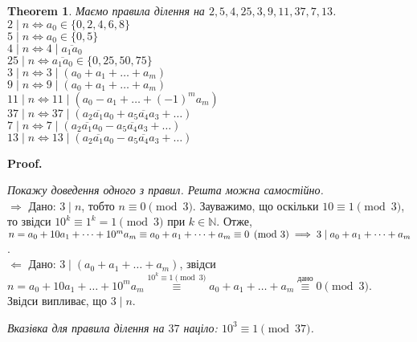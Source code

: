 \documentclass[a4paper, 14pt]{extarticle}
\makeatletter
\theoremstyle{theoremdd}
\newtheorem{theorem}{Theorem}[subsection]
\theoremstyle{theoremdd}
\theoremstyle{theoremdd}
\theoremstyle{theoremdd}
\theoremstyle{theoremdd}
\theoremstyle{theoremdd}
\theoremstyle{theoremdd}
\theoremstyle{theoremdd}
\def\qed{$\blacksquare$}
\def\rightproof{$\boxed{\Rightarrow}$ }
\def\leftproof{$\boxed{\Leftarrow}$ }
\renewenvironment{proof}[1][Proof.\\]{\par
\pushQED{\hfill \qed}%
\normalfont \topsep6\p@\@plus6\p@\relax
\trivlist
\item\relax
{\bfseries
#1\@addpunct{.}}\hspace\labelsep\ignorespaces
}{%
\popQED\endtrivlist\@endpefalse
}
\makeatother
\begin{document}
\begin{theorem}
Маємо правила ділення на $2,5,4,25,3,9,11,37,7,13$.\\
$2 \mid n \iff a_0 \in \{0,2,4,6,8\}$\\
$5 \mid n \iff a_0 \in \{0,5\}$\\
$4 \mid n \iff 4 \mid \overline{a_1a_0}$\\
$25 \mid n \iff \overline{a_1a_0} \in \{0,25,50,75\}$\\
$3 \mid n \iff 3 \mid (a_0 + a_1 + \dots + a_m)$\\
$9 \mid n \iff 9 \mid (a_0 + a_1 + \dots + a_m)$\\
$11 \mid n \iff 11 \mid (a_0 - a_1 + \dots + (-1)^m a_m)$\\
$37 \mid n \iff 37 \mid (\overline{a_2a_1a_0} + \overline{a_5a_4a_3} + \dots)$\\
$7 \mid n \iff 7 \mid (\overline{a_2a_1a_0} - \overline{a_5a_4a_3} + \dots)$\\
$13 \mid n \iff 13 \mid (\overline{a_2a_1a_0} - \overline{a_5a_4a_3} + \dots)$
\end{theorem}

\begin{proof}
\textit{Покажу доведення одного з правил. Решта можна самостійно.}\\
\rightproof Дано: $3 \mid n$, тобто $n \equiv 0 \pmod 3$. Зауважимо, що оскільки $10 \equiv 1 \pmod 3$, то звідси $10^k \equiv 1^k = 1 \pmod 3$ при $k \in \mathbb{N}$. Отже,\\
$n = a_0 + 10a_1 + \dots + 10^m a_m \equiv a_0 + a_1 + \dots + a_m \equiv 0 \pmod 3 \\ \implies 3 \mid a_0 + a_1 + \dots + a_m$.
\bigskip \\
\leftproof Дано: $3 \mid (a_0 + a_1 + \dots + a_m)$, звідси\\
$n = a_0 + 10 a_1 + \dots + 10^m a_m \overset{10^k \equiv 1 \pmod 3}{\equiv} a_0 + a_1 + \dots + a_m \overset{\text{дано}}{\equiv} 0 \pmod 3$.\\
Звідси випливає, що $3 \mid n$.
\end{proof}

\textit{Вказівка для правила ділення на $37$ націло: $10^3 \equiv 1 \pmod {37}$.}
\end{document}
